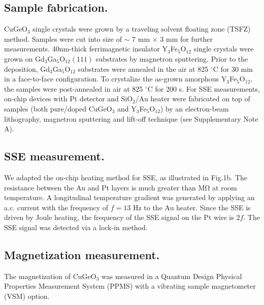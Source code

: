 \documentclass{nature}
\begin{document}
\begin{methods}

\subsection{Sample fabrication.} 
CuGeO$_3$ single crystals were grown by a traveling solvent floating zone (TSFZ) method. Samples were cut into size of $\sim$ 7 mm $\times$ 3 mm for further measurements.
40nm-thick ferrimagnetic insulator Y$_3$Fe$_5$O$_{12}$ single crystals were grown on Gd$_3$Ga$_5$O$_{12} (111)$ substrates by magnetron sputtering.
Prior to the deposition, Gd$_3$Ga$_5$O$_{12}$ substrates were annealed in the air at 825 $^{\circ}$C for 30 min in a face-to-face configuration.
To crystalize the as-grown amorphous Y$_3$Fe$_5$O$_{12}$, the samples were post-annealed in air at 825 $^{\circ}$C for 200 s.
For SSE measurements, on-chip devices with Pt detector and SiO$_2$/Au heater were fabricated on top of samples (both pure/doped CuGeO$_3$ and Y$_3$Fe$_5$O$_{12}$) by an electron-beam lithography, magnetron sputtering and lift-off technique (see Supplementary Note A).

\subsection{ SSE measurement.}
We adapted the on-chip heating method for SSE, as illustrated in Fig.1b. 
 The resistance between the Au and Pt layers is much greater than $\mathrm{M\Omega}$ at room temperature. 
A longitudinal temperature gradient was generated by applying an a.c. current with the frequency of $f = 13$ Hz to the Au heater. 
Since the SSE is driven by Joule heating, the frequency of the SSE signal on the Pt wire is $2f$.
 The SSE signal was detected via a lock-in method. 


\subsection{Magnetization measurement.} The magnetization of CuGeO$_3$ was measured in a Quantum Design Physical Properties Measurement System (PPMS) with a vibrating sample magnetometer (VSM) option.



\end{methods}
\end{document}
